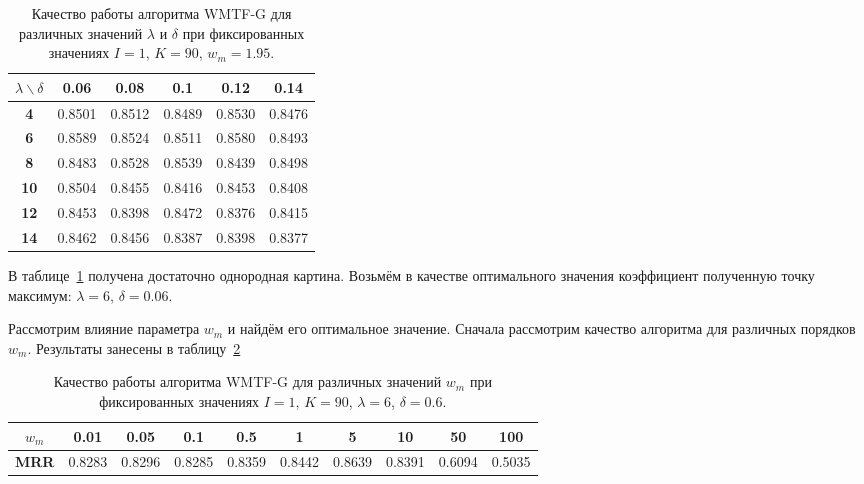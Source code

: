     \begin{table}[ht!]
        \caption{Качество работы алгоритма WMTF-G для различных значений $\lambda$ и $\delta$ при фиксированных значениях $I=1$, $K=90$, $w_m=1.95$. \bigskip}
        \centering

        \label{tabular:wtmfg_test2}
        \begin{tabular}{|c|c|c|c|c|c|} \hline
            $\lambda \backslash \delta$ & \bf{0.06} & \bf{0.08} & \bf{0.1} & \bf{0.12} & \bf{0.14}  \\ \hline
            \bf{4}  & 0.8501 & 0.8512 & 0.8489 & 0.8530 & 0.8476  \\ \hline
            \bf{6}  & 0.8589 & 0.8524 & 0.8511 & 0.8580 & 0.8493  \\ \hline
            \bf{8}  & 0.8483 & 0.8528 & 0.8539 & 0.8439 & 0.8498  \\ \hline
            \bf{10} & 0.8504 & 0.8455 & 0.8416 & 0.8453 & 0.8408  \\ \hline
            \bf{12} & 0.8453 & 0.8398 & 0.8472 & 0.8376 & 0.8415  \\ \hline
            \bf{14} & 0.8462 & 0.8456 & 0.8387 & 0.8398 & 0.8377  \\ \hline
        \end{tabular}
    \end{table}

    В таблице~\ref{tabular:wtmfg_test2} получена достаточно однородная картина. Возьмём в качестве оптимального значения коэффициент полученную точку максимум: $\lambda=6$, $\delta=0.06$.

    Рассмотрим влияние параметра $w_m$ и найдём его оптимальное значение. Сначала рассмотрим качество алгоритма для различных порядков $w_m$.
    Результаты занесены в таблицу~\ref{tabular:wtmfg_test3}

    \begin{table}[ht!]
        \caption{Качество работы алгоритма WMTF-G для различных значений $w_m$ при фиксированных значениях $I=1$, $K=90$, $\lambda=6$, $\delta=0.6$. \bigskip}
        \centering

        \label{tabular:wtmfg_test3}
        \begin{tabular}{|c|c|c|c|c|c|c|c|c|c|} \hline
            $w_m$ & 0.01 & 0.05 & 0.1 & 0.5 & 1 & 5 & 10 & 50 & 100 \\ \hline
            \bf{MRR} & 0.8283 & 0.8296 & 0.8285 & 0.8359 & 0.8442 & 0.8639 & 0.8391 & 0.6094 & 0.5035 \\ \hline

        \end{tabular}
    \end{table}

